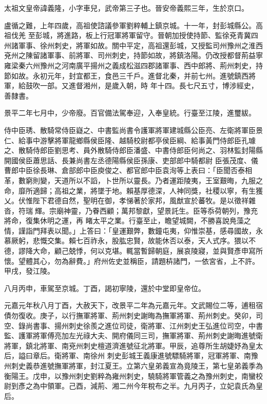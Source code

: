 
\begin{pinyinscope}

 太祖文皇帝諱義隆，小字車兒，武帝第三子也。晉安帝義熙三年，生於京口。



 盧循之難，上年四歲，高祖使諮議參軍劉粹輔上鎮京城。十一年，封彭城縣公。高祖伐羌
 至彭城，將進路，板上行冠軍將軍留守。晉朝加授使持節、監徐兗青冀四州諸軍事、徐州刺史，將軍如故。關中平定，高祖還彭城，又授監司州豫州之淮西兗州之陳留諸軍事、前將軍、司州刺史，持節如故，將鎮洛陽。仍改授都督荊益寧雍梁秦六州豫州之河南廣平揚州之義成松滋四郡諸軍事、西中郎將、荊州刺史，持節如故。永初元年，封宜都王，食邑三千戶。進督北秦，并前七州。進號鎮西將軍，給鼓吹一部。又進督湘州，是歲入朝，時
 年十四。長七尺五寸，博涉經史，善隸書。



 景平二年七月中，少帝廢。百官備法駕奉迎，入奉皇統。行臺至江陵，進璽紱。



 侍中臣琇、散騎常侍臣嶷之、中書監尚書令護軍將軍建城縣公臣亮、左衛將軍臣景仁、給事中游擊將軍龍鄉縣侯臣隆、越騎校尉都亭侯臣綱、給事黃門侍郎臣孔璩之、散騎侍郎臣劉思考、員外散騎侍郎臣潘盛、中書侍郎臣何尚之、羽林監封陽縣開國侯臣蕭思話、長兼尚書左丞德陽縣侯臣孫康、吏部郎中騎都尉
 臣張茂度、儀曹郎中臣徐長琳、倉部郎中臣庾俊之、都官郎中臣袁洵等上表曰：「臣聞否泰相革，數窮則變，天道所以不謟，卜世所以靈長。乃者運距陵夷，王室艱晦，九服之命，靡所適歸；高祖之業，將墜于地。賴基厚德深，人神同獎，社稷以寧，有生獲乂。伏惟陛下君德自然，聖明在御，孝悌著於家邦，風猷宣於蕃牧。是以徵祥雜沓，符瑞輝。宗廟神靈，乃眷西顧；萬邦黎獻，望景託生。臣等忝荷朝列，豫充將命，復集休明之運，再
 睹太平之業。行臺至止，瞻望城闕，不勝喜說鳧藻之情，謹詣門拜表以聞。」上答曰：「皇運艱弊，數鐘屯夷，仰惟崇基，感尋國故，永慕厥躬，悲慨交集。賴七百祚永，股肱忠賢，故能休否以泰，天人式序。猥以不德，謬降大命，顧己兢悸，何以克堪。輒當暫歸朝庭，展哀陵寢，並與賢彥申寫所懷。望體其心，勿為辭費。」府州佐史並稱臣，請題枿諸門，一依宮省，上不許。甲戌，發江陵。



 八月丙申，車駕至京城。丁酉，謁初寧陵，還於中堂即皇帝位。



 元嘉元年秋八月丁酉，大赦天下，改景平二年為元嘉元年。文武賜位二等，逋租宿債勿復收。庚子，以行撫軍將軍、荊州刺史謝晦為撫軍將軍、荊州刺史。癸卯，司空、錄尚書事、揚州刺史徐羨之進位司徒，衛將軍、江州刺史王弘進位司空，中書監、護軍將軍傅亮加左光祿大夫、開府儀同三司，撫軍將軍、荊州刺史謝晦進號衛將軍，鎮北將軍、南兗州刺史檀道濟進號征北將軍。甲辰，追尊所生胡婕妤為皇太后，謚曰章后。衛將軍、南徐州
 刺史彭城王義康進號驃騎將軍，冠軍將軍、南豫州刺史義恭進號撫軍將軍，封江夏王。立第六皇弟義宣為竟陵王，第七皇弟義季為衡陽王。戊申，以豫州刺史劉粹為雍州刺史，驍騎將軍管義之為豫州刺史，南蠻校尉到彥之為中領軍。己酉，減荊、湘二州今年稅布之半。九月丙子，立妃袁氏為皇后。




\end{pinyinscope}
